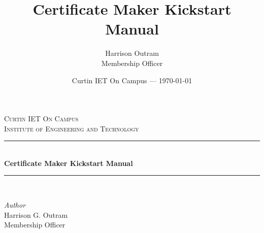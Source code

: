 \documentclass[11pt]{article}
\title{Certificate Maker Kickstart Manual} %
\author{Harrison Outram\\ Membership Officer}
\date{Curtin IET On Campus --- \today} %
\begin{document}

\begin{titlepage} %
    \newcommand{\HRule}{\rule{\linewidth}{0.5mm}} %
    
    \center %
    
    
    \textsc{\LARGE Curtin IET On Campus}\\[1.5cm] %
    
    \textsc{\Large Institute of Engineering and Technology}\\[0.5cm] %
    
    
    \HRule\\[0.4cm]
    
    {\huge\bfseries Certificate Maker Kickstart Manual}\\[0.4cm] %
    
    \HRule\\[1.5cm]
    
    
    \begin{minipage}{0.4\textwidth}
        \begin{flushleft}
            \large
            \textit{Author}\\
            Harrison G. Outram \\
            Membership Officer
        \end{flushleft}
    \end{minipage}
    ~
    
    

\end{titlepage}
\end{document}
